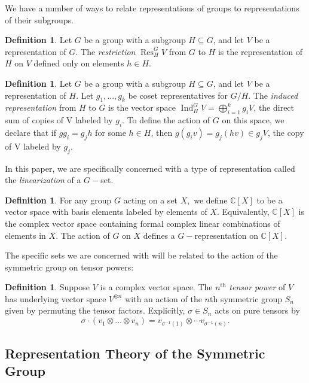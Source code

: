\documentclass{amsart}
\theoremstyle{plain}
\theoremstyle{definition}
\newtheorem{definition}[theorem]{Definition}
\DeclareMathOperator{\Ind}{Ind}
\DeclareMathOperator{\Res}{Res}
\newcommand{\C}{\mathbb{C}}
\begin{document}
We have a number of  ways to relate representations of groups to representations of their subgroups. 

\begin{definition}
    Let $G$ be a group with a subgroup $H \subseteq G$, and let $V$ be a representation of $G$. The \textit{restriction} $\Res^G_H V$ from $G$ to $H$ is the representation of $H$ on $V$ defined only on elements $h \in H$.
\end{definition}

\begin{definition}
    Let $G$ be a group with a subgroup $H \subseteq G$, and let $V$ be a representation of $H$. Let $g_1, ..., g_k$ be coset representatives for $G/H$. The \textit{induced representation} from $H$ to $G$ is the vector space $\Ind_H^G V =  \bigoplus_{i=1}^{k} g_iV$, the direct sum of copies of V labeled by $g_i$. To define the action of $G$ on this space, we declare that if $g g_i = g_j h$ for some $h \in H$, then $g (g_iv) = g_j(hv) \in g_j V$, the copy of V labeled by $g_j$. 
\end{definition}

In this paper, we are specifically concerned with a type of representation called the \textit{linearization} of a $G-$set. 

\begin{definition}\label{linearization}
    For any group $G$ acting on a set $X,$ we define $\C[X]$  to be a vector space with basis elements labeled by elements of $X$. Equivalently, $\C[X]$ is the complex vector space containing formal complex linear combinations of elements in $X$. The action of $G$ on $X$ defines a $G-$representation on $\C[X]$.
\end{definition}

The specific sets we are concerned with will be related to the action of the symmetric group on tensor powers:

\begin{definition}
    Suppose $V$ is a complex vector space. The $n^{\text{th}}$ \textit{tensor power} of $V$ has underlying vector space $V^{\otimes n}$ with an action of the $n$th symmetric group $S_n$ given by permuting the tensor factors. Explicitly, $\sigma\in S_n$ acts on pure tensors by 
    $$\sigma\cdot (v_1\otimes\dots\otimes v_n)= v_{\sigma^{-1}(1)}\otimes \cdots v_{\sigma^{-1}(n)}.$$
 \end{definition}


\subsection{Representation Theory of the Symmetric Group }
\end{document}

